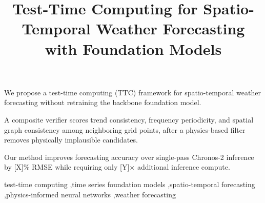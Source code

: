 \documentclass[preprint,12pt]{elsarticle}
\begin{document}
\begin{frontmatter}

\title{Test-Time Computing for Spatio-Temporal Weather Forecasting with Foundation Models}

\begin{abstract}
\end{abstract}

\begin{highlights}

\item We propose a test-time computing (TTC) framework for spatio-temporal weather forecasting without retraining the backbone foundation model.
\item A composite verifier scores trend consistency, frequency periodicity, and spatial graph consistency among neighboring grid points, after a physics-based filter removes physically implausible candidates.

\item Our method improves forecasting accuracy over single-pass Chronos-2 inference by [X]\% RMSE while requiring only [Y]$\times$ additional inference compute.
\end{highlights}

\author[csdept]{}
\author[csdept]{}

\begin{keyword}
test-time computing \sep time series foundation models \sep spatio-temporal forecasting \sep physics-informed neural networks \sep weather forecasting
\end{keyword}

\end{frontmatter}
\end{document}
